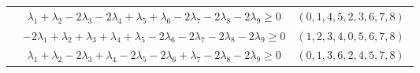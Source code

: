 \documentclass[12pt,landscape]{article}
\begin{document}
\begin{longtable}[l]{|c|c|c|}
 \cline{2-3} 
 & $\lambda_{1} + \lambda_{2}-2\lambda_{3}-2\lambda_{4} + \lambda_{5} + \lambda_{6}-2\lambda_{7}-2\lambda_{8}-2\lambda_{9}\geq 0$ & $(0 ,1 ,4 ,5 ,2 ,3 ,6 ,7 ,8) \;$\\ 
 \cline{2-3} 
 & $-2\lambda_{1} + \lambda_{2} + \lambda_{3} + \lambda_{4} + \lambda_{5}-2\lambda_{6}-2\lambda_{7}-2\lambda_{8}-2\lambda_{9}\geq 0$ & $(1 ,2 ,3 ,4 ,0 ,5 ,6 ,7 ,8) \;$\\ 
 \cline{2-3} 
 & $\lambda_{1} + \lambda_{2}-2\lambda_{3} + \lambda_{4}-2\lambda_{5}-2\lambda_{6} + \lambda_{7}-2\lambda_{8}-2\lambda_{9}\geq 0$ & $(0 ,1 ,3 ,6 ,2 ,4 ,5 ,7 ,8) \;$\\ \hline
  
 \end{longtable} 
 
\end{document}
